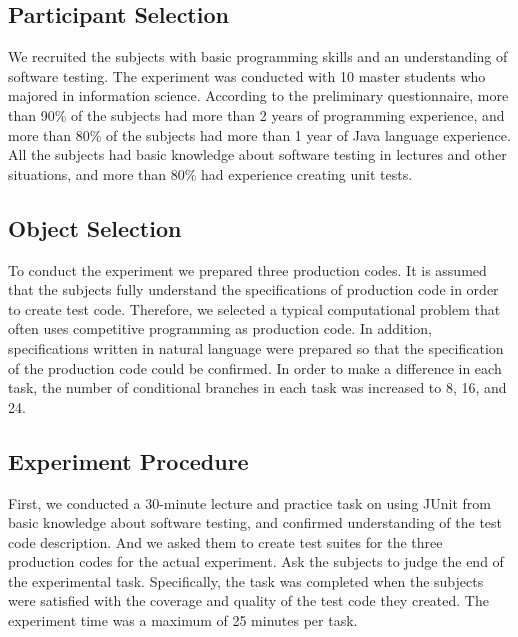 \documentclass[conference]{IEEEtran}
\begin{document}
\subsection{Participant Selection}
We recruited the subjects with basic programming skills and an understanding of software testing. The experiment was conducted with 10 master students who majored in information science. According to the preliminary questionnaire, more than 90\% of the subjects had more than 2 years of programming experience, and more than 80\% of the subjects had more than 1 year of Java language experience. All the subjects had basic knowledge about software testing in lectures and other situations, and more than 80\% had experience creating unit tests.

\subsection{Object Selection}
To conduct the experiment we prepared three production codes. It is assumed that the subjects fully understand the specifications of production code in order to create test code. Therefore, we selected a typical computational problem that often uses competitive programming as production code. In addition, specifications written in natural language were prepared so that the specification of the production code could be confirmed. In order to make a difference in each task, the number of conditional branches in each task was increased to 8, 16, and 24.




\subsection{Experiment Procedure}
First, we conducted a 30-minute lecture and practice task on using JUnit from basic knowledge about software testing, and confirmed understanding of the test code description. And we asked them to create test suites for the three production codes for the actual experiment. Ask the subjects to judge the end of the experimental task. Specifically, the task was completed when the subjects were satisfied with the coverage and quality of the test code they created. The experiment time was a maximum of 25 minutes per task.
\end{document}
